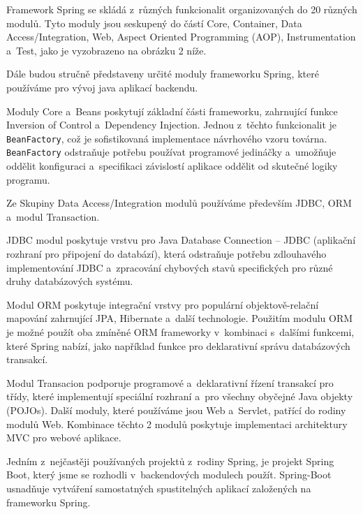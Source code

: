\documentclass[12pt]{article}
\begin{document}
{Framework Spring se skládá z~různých funkcionalit organizovaných do 20 různých modulů.
Tyto moduly jsou seskupený do částí Core, Container, Data Access/Integration,
Web, Aspect Oriented Programming (AOP), Instrumentation a~Test,
jako je vyzobrazeno na obrázku 2 níže.

\cite{springFrameworkDocs}

\obrazek
{}

Dále budou stručně představeny určité moduly frameworku Spring,
které používáme pro vývoj java aplikací backendu.

Moduly Core a~Beans poskytují základní části frameworku,
zahrnující funkce Inversion of Control a~Dependency Injection.
Jednou z~těchto funkcionalit je \texttt{BeanFactory},
což je sofistikovaná implementace návrhového vzoru továrna.
\texttt{BeanFactory} odstraňuje potřebu používat programové jedináčky
a~umožňuje oddělit konfiguraci a~specifikaci závislostí aplikace oddělit od skutečné logiky programu.


Ze Skupiny Data Access/Integration modulů používáme především JDBC, ORM
a~modul Transaction.

JDBC modul poskytuje vrstvu pro Java Database Connection
-- JDBC (aplikační rozhraní pro připojení do databází), 
která odstraňuje potřebu zdlouhavého implementování JDBC a~zpracování chybových stavů specifických pro různé druhy databázových systému.

Modul ORM poskytuje integrační vrstvy pro populární objektově-relační mapování
zahrnující JPA, Hibernate a~další technologie.
Použitím modulu ORM je možné použít oba zmíněné ORM frameworky 
v~kombinaci s~dalšími funkcemi, které Spring nabízí, 
jako například funkce pro deklarativní správu databázových transakcí.

Modul Transacion podporuje programové a~deklarativní řízení
transakcí pro třídy, které implementují speciální rozhraní
a~pro všechny obyčejné Java objekty (POJOs).
Další moduly, které používáme jsou Web a~Servlet, patřící do rodiny modulů Web.
Kombinace těchto 2 modulů poskytuje implementaci architektury MVC
pro webové aplikace.

\cite{springFrameworkDocs}

Jedním z~nejčastěji používaných projektů z~rodiny Spring,
je projekt Spring Boot, který jsme se rozhodli v~backendových modulech použít.
Spring-Boot usnadňuje vytváření samostatných spustitelných aplikací
založených na frameworku Spring.

}
\end{document}
